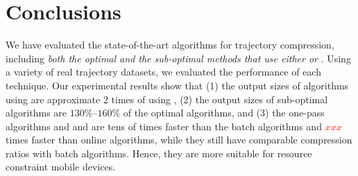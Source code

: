 \vspace{-1ex}
\section{Conclusions}

We have evaluated the state-of-the-art \lsa algorithms for trajectory compression, including \emph{both the optimal and the sub-optimal methods that use either \ped or \sed}. 
Using a variety of real trajectory datasets, we evaluated the performance of each technique.%
Our experimental results show that 
(1) the output sizes of algorithms using \sed are approximate $2$ times of using \ped, 
(2) the output sizes of sub-optimal algorithms are $130\%$--$160\%$ of the optimal algorithms, and 
(3) the one-pass algorithms \siped and \operb and \cised are tens of times faster than the batch algorithms and \textcolor{red}{$xxx$} times faster than online algorithms, while they still have comparable compression ratios with batch algorithms. Hence, they are more suitable for resource constraint mobile devices.